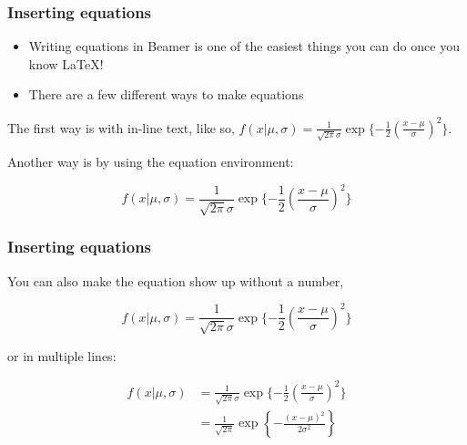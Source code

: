 \documentclass{beamer}
\begin{document}




\begin{frame}
\frametitle{Inserting equations}

\begin{itemize}
    \item<1-> Writing equations in Beamer is one of the easiest things you can do once you know \LaTeX! \pause
    \item<2-> There are a few different ways to make equations \pause
\end{itemize}

\hspace{0.5cm}

The first way is with in-line text, like so, \pause $f(x| \mu, \sigma) = \frac{1}{\sqrt{2\pi}\sigma}\exp\{-\frac{1}{2}(\frac{x-\mu}{\sigma})^2\}$. \pause

\hspace{0.5cm}

Another way is by using the equation environment: \pause

\begin{equation}
f(x| \mu, \sigma) = \frac{1}{\sqrt{2\pi}\sigma}\exp\{-\frac{1}{2}(\frac{x-\mu}{\sigma})^2\}
\end{equation}

\end{frame}





\begin{frame}
\frametitle{Inserting equations}

You can also make the equation show up without a number,

\begin{equation*}
f(x| \mu, \sigma) = \frac{1}{\sqrt{2\pi}\sigma}\exp\{-\frac{1}{2}(\frac{x-\mu}{\sigma})^2\}
\end{equation*} \pause

\hspace{0.5cm}

or in multiple lines:

\begin{align*}
f(x| \mu, \sigma) &= \frac{1}{\sqrt{2\pi}\sigma}\exp\{-\frac{1}{2}(\frac{x-\mu}{\sigma})^2\} \\
&= \frac{1}{\sqrt{2\pi}}\exp \left\{-\frac{(x-\mu)^2}{2\sigma^2}\right\}
\end{align*}

\end{frame}
\end{document}
